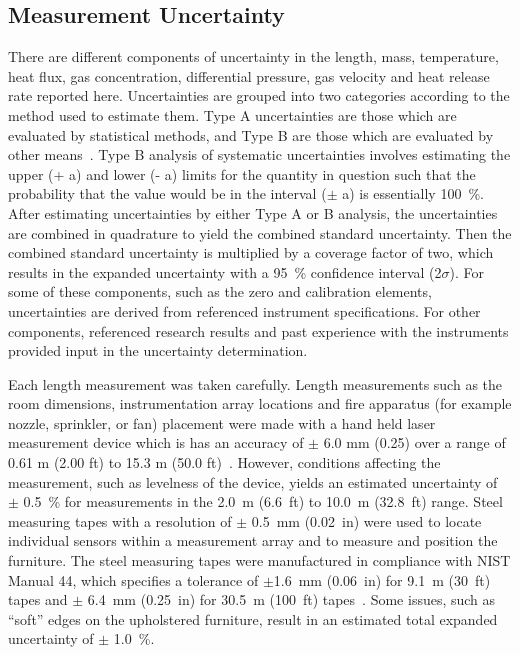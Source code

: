 \documentclass[12pt,oneside]{book}
\begin{document}
\clearpage

\subsection{Measurement Uncertainty}
\label{subsec:Uncertainty}

There are different components of uncertainty in the length, mass, temperature, heat flux, gas concentration, differential pressure, gas velocity and heat release rate reported here. Uncertainties are grouped into two categories according to the method used to estimate them. Type A uncertainties are those which are evaluated by statistical methods, and Type B are those which are evaluated by other means~\cite{Taylor&Kuyatt:1994}. Type B analysis of systematic uncertainties involves estimating the upper (+ a) and lower (- a) limits for the quantity in question such that the probability that the value would be in the interval ($\pm$ a) is essentially 100~\%. After estimating uncertainties by either Type A or B analysis, the uncertainties are combined in quadrature to yield the combined standard uncertainty. Then the combined standard uncertainty is multiplied by a coverage factor of two, which results in the expanded uncertainty with a 95~\% confidence interval (2$\sigma$).  For some of these components, such as the zero and calibration elements, uncertainties are derived from referenced instrument specifications. For other components, referenced research results and past experience with the instruments provided input in the uncertainty determination.

Each length measurement was taken carefully. Length measurements such as the room dimensions, instrumentation array locations and fire apparatus (for example nozzle, sprinkler, or fan) placement were made with a hand held laser measurement device which is has an accuracy of $\pm$ 6.0 mm (0.25) over a range of 0.61 m (2.00 ft) to 15.3 m (50.0 ft)~\cite{StanleyTools}.  However, conditions affecting the measurement, such as levelness of the device, yields an estimated uncertainty of $\pm$ 0.5~\% for measurements in the 2.0~m (6.6~ft) to 10.0~m (32.8~ft) range.  Steel measuring tapes with a resolution of  $\pm$ 0.5~mm (0.02~in) were used to locate individual sensors within a measurement array and to measure and position the furniture. The steel measuring tapes were manufactured in compliance with NIST Manual 44, which specifies a tolerance of $\pm$1.6~mm (0.06~in) for 9.1~m (30~ft) tapes and $\pm$ 6.4~mm (0.25~in) for 30.5~m (100~ft) tapes~\cite{Butcher:2012}. Some issues, such as ``soft'' edges on the upholstered furniture, result in an estimated total expanded uncertainty of $\pm$ 1.0~\%.
\end{document}
